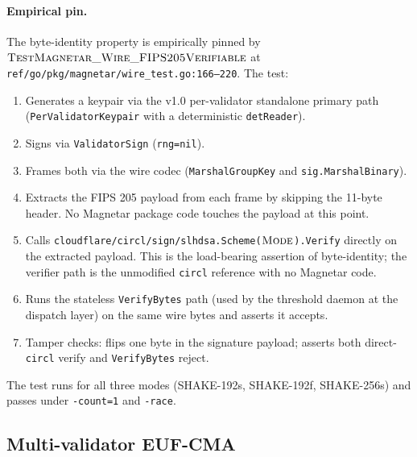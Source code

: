 \paragraph{Empirical pin.} The byte-identity property is
empirically pinned by
$\textsc{TestMagnetar\_Wire\_FIPS205Verifiable}$ at
\texttt{ref/go/pkg/magnetar/wire\_test.go:166--220}. The test:
\begin{enumerate}[leftmargin=2em,nosep]
  \item Generates a keypair via the v1.0 per-validator standalone
        primary path
        (\texttt{PerValidatorKeypair} with a deterministic
        \texttt{detReader}).
  \item Signs via \texttt{ValidatorSign} (\texttt{rng=nil}).
  \item Frames both via the wire codec
        (\texttt{MarshalGroupKey} and \texttt{sig.MarshalBinary}).
  \item Extracts the FIPS 205 payload from each frame by skipping
        the 11-byte header. No Magnetar package code touches the
        payload at this point.
  \item Calls
        \texttt{cloudflare/circl/sign/slhdsa.Scheme($\textsc{Mode}$).Verify}
        directly on the extracted payload. This is the load-bearing
        assertion of byte-identity; the verifier path is the
        unmodified \texttt{circl} reference with no Magnetar code.
  \item Runs the stateless \texttt{VerifyBytes} path (used by the
        threshold daemon at the dispatch layer) on the same wire
        bytes and asserts it accepts.
  \item Tamper checks: flips one byte in the signature payload;
        asserts both direct-\texttt{circl} verify and
        \texttt{VerifyBytes} reject.
\end{enumerate}
The test runs for all three modes (SHAKE-192s, SHAKE-192f,
SHAKE-256s) and passes under \texttt{-count=1} and \texttt{-race}.

\subsection{Multi-validator EUF-CMA}
\label{sec:security:multi-eufcma}

